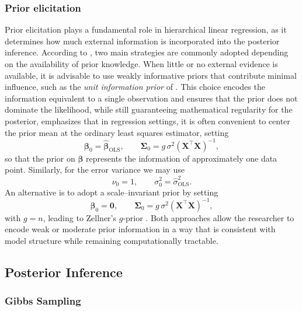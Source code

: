 \subsubsection{Prior elicitation}

Prior elicitation plays a fundamental role in hierarchical linear regression, as it determines how much external information is incorporated into the posterior inference. According to \cite{SOSA}, two main strategies are commonly adopted depending on the availability of prior knowledge. When little or no external evidence is available, it is advisable to use weakly informative priors that contribute minimal influence, such as the \emph{unit information prior} of \cite{KassWasserman1995}. This choice encodes the information equivalent to a single observation and ensures that the prior does not dominate the likelihood, while still guaranteeing mathematical regularity for the posterior, \cite{HOFF} emphasizes that in regression settings, it is often convenient to center the prior mean at the ordinary least squares estimator, setting
\begin{equation}
    \bm{\beta}_0 = \hat{\bm{\beta}}_{\text{OLS}}, \qquad
    \bm{\Sigma}_0 = g \, \sigma^2 \left(\bm{X}^\top \bm{X}\right)^{-1},
\end{equation}
so that the prior on $\bm{\beta}$ represents the information of approximately one data point. Similarly, for the error variance we may use
\begin{equation}
    \nu_0 = 1, \qquad \sigma_0^2 = \hat{\sigma}^2_{\text{OLS}}.
\end{equation}
An alternative is to adopt a scale–invariant prior by setting
\begin{equation}
    \bm{\beta}_0 = \bm{0}, \qquad \bm{\Sigma}_0 = g \, \sigma^2 \left(\bm{X}^\top \bm{X}\right)^{-1},
\end{equation}
with $g=n$, leading to Zellner’s $g$‑prior \cite{Zellner1986}. Both approaches allow the researcher to encode weak or moderate prior information in a way that is consistent with model structure while remaining computationally tractable.


\subsection{Posterior Inference}

\subsubsection{Gibbs Sampling}

